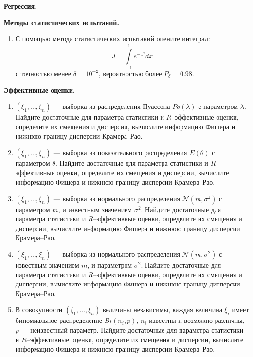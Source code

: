 \documentclass[a4paper,12pt]{article}
\newcommand{\sample}[2]{\left( #1_1, \dots, #1_{#2} \right)}
\newcommand{\theme}[1]{\hfil \textbf{#1} \hfil}
\begin{document}
    \theme{Регрессия.}

    \theme{Методы статистических испытаний.}

    \begin{enumerate}[topsep=1cm, parsep=1cm, resume]
        \item С помощью метода статистических испытаний оцените интеграл:
              \[
                  J = \int \limits_{-1}^1 e^{-x^2} dx
              \]
              с точностью менее $\delta = 10^{-2}$, вероятностью более $P_\delta = 0.98$.
    \end{enumerate}

    \theme{Эффективные оценки.}
    \begin{enumerate}[topsep=1cm, parsep=1cm, resume]
        \item $\sample{\xi}{n}$ --- выборка из распределения Пуассона $Po(\lambda)$ с параметром $\lambda$. Найдите достаточные для параметра статистики
              и $R$--эффективные оценки, определите их смещения и дисперсии, вычислите информацию Фишера и нижнюю границу дисперсии Крамера--Рао.

        \item $\sample{\xi}{n}$ --- выборка из показательного распределения $E(\theta)$ с параметром $\theta$. Найдите достаточные для параметра статистики
              и $R$--эффективные оценки, определите их смещения и дисперсии, вычислите информацию Фишера и нижнюю границу дисперсии Крамера--Рао.

        \item $\sample{\xi}{n}$ --- выборка из нормального распределения $\mathcal{N} (m, \sigma^2)$ с параметром $m$, и известным значением $\sigma^2$.
              Найдите достаточные для параметра статистики и $R$--эффективные оценки, определите их смещения и дисперсии, вычислите информацию Фишера
              и нижнюю границу дисперсии Крамера--Рао.

        \item $\sample{\xi}{n}$ --- выборка из нормального распределения $\mathcal{N} (m, \sigma^2)$ с известным значением $m$, и параметром $\sigma^2$.
              Найдите достаточные для параметра статистики и $R$--эффективные оценки, определите их смещения и дисперсии, вычислите информацию Фишера
              и нижнюю границу дисперсии Крамера--Рао.

        \item В совокупности $\sample{\xi}{n}$ величины независимы, каждая величина $\xi_i$ имеет биномиальное распределение $Bi(n_i,p)$, $n_i$
              известны и возможно различны, $p$ --- неизвестный параметр. Найдите достаточные для параметра статистики и $R$--эффективные оценки,
              определите их смещения и дисперсии, вычислите информацию Фишера и нижнюю границу дисперсии Крамера--Рао.


\end{enumerate}
\end{document}
